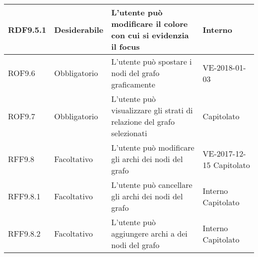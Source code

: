 \documentclass[../AnalisideiRequisiti.tex]{subfiles}
\begin{document}
\begin{longtable}{| p{2cm} | p{2.5cm} |p{5cm} | p{2.5cm} |}
		\newline RDF9.5.1&\newline Desiderabile&
		\newline L'utente può modificare il colore con cui si evidenzia il focus&
		\newline Interno
		\\[1em]
		\hline
		
		\newline ROF9.6&\newline Obbligatorio&
		\newline L'utente può spostare i nodi del grafo graficamente&
		\newline {}{UC23.2} \newline VE-2018-01-03
		\\[1em]
		\hline
		
		\newline ROF9.7&\newline Obbligatorio&
		\newline L'utente può visualizzare gli strati di relazione del grafo selezionati&
		\newline {}{UC23.5} \newline Capitolato
		\\[1em]
		\hline
	
		\newline RFF9.8&\newline Facoltativo&
		\newline L'utente può modificare gli archi dei nodi del grafo&
		\newline  VE-2017-12-15 \newline Capitolato
		\\[1em]
		\hline
		
		\newline RFF9.8.1&\newline Facoltativo&
		\newline L'utente può cancellare gli archi dei nodi del grafo&
		\newline Interno \newline Capitolato
		\\[1em]
		\hline
		
		\newline RFF9.8.2&\newline Facoltativo&
		\newline L'utente può aggiungere archi a dei nodi del grafo&
		\newline Interno \newline Capitolato
		\\[1em]
		\hline
		

\end{longtable}
\end{document}
